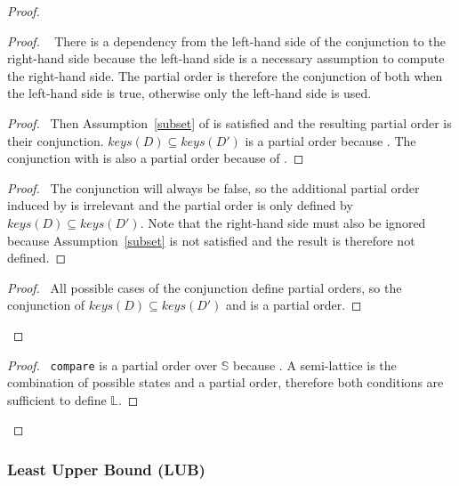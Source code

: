 \documentclass[11pt, oneside]{article}   	%
\begin{document}
\begin{proof}
			\begin{proof}
				\pfsketch~ There is a dependency from the left-hand side of the conjunction to the right-hand side because the left-hand side is a necessary assumption to compute the right-hand side. The partial order is therefore the conjunction of both when the left-hand side is true, otherwise only the left-hand side is used.
				\begin{proof}
					\pf~Then Assumption~\ref{subset} of  is satisfied and the resulting partial order is their conjunction. $\textit{keys}(D) \subseteq \textit{keys}(D')$ is a partial order because . The conjunction with  is also a partial order because of .
				\end{proof}
				
				\begin{proof}
					\pf~The conjunction will always be false, so the additional partial order induced by  is irrelevant and the partial order is only defined by $\textit{keys}(D) \subseteq \textit{keys}(D')$. Note that the right-hand side must also be ignored because Assumption~\ref{subset} is not satisfied and the result is therefore not defined.
				\end{proof}
				
				\qedstep
				\begin{proof}
					\pf~All possible cases of the conjunction define partial orders, so the conjunction of $\textit{keys}(D) \subseteq \textit{keys}(D')$ and  is a partial order.
				\end{proof}
			\end{proof}
			
			\qedstep
			\begin{proof}
				\pf~\texttt{compare} is a partial order over $\mathds{S}$ because . A semi-lattice is the combination of possible states and a partial order, therefore both conditions are sufficient to define $\mathds{L}$.
			\end{proof}			
	\end{proof}

\subsubsection{Least Upper Bound (LUB)}
\label{sec:longer-proofs:lub}
\end{document}
